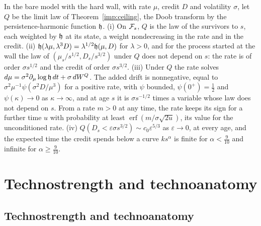 \begin{proposition}\label{imp:limitage}
In the bare model with the hard wall, with rate $\mu$, credit $D$ and
volatility $\sigma$, let $Q$ be the limit law of
Theorem~\ref{imp:ceiling}, the Doob transform by the persistence-harmonic
function $\mathfrak{h}$. (i) On $\mathcal{F}_s$, $Q$ is the law of the survivors to $s$,
each weighted by $\mathfrak{h}$ at its state, a weight nondecreasing in the rate
and in the credit. (ii)
$\mathfrak{h}(\lambda\mu,\lambda^3D)=\lambda^{1/2}\mathfrak{h}(\mu,D)$ for $\lambda>0$, and
for the process started at the wall the law of
$(\mu_s/s^{1/2},D_s/s^{3/2})$ under $Q$ does not depend on $s$: the rate
is of order $\sigma s^{1/2}$ and the credit of order $\sigma s^{3/2}$.
(iii) Under $Q$ the rate solves
$d\mu=\sigma^2\partial_\mu\log\mathfrak{h}\,dt+\sigma\,dW^Q$. The added drift is
nonnegative, equal to $\sigma^2\mu^{-1}\psi(\sigma^2D/\mu^3)$ for a
positive rate, with $\psi$ bounded, $\psi(0^+)=\tfrac12$ and
$\psi(\kappa)\to0$ as $\kappa\to\infty$, and at age $s$ it is
$\sigma s^{-1/2}$ times a variable whose law does not depend on $s$. From
a rate $m>0$ at any time, the rate keeps its sign for a further time $u$
with probability at least $\operatorname{erf}(m/\sigma\sqrt{2u})$, its
value for the unconditioned rate. (iv)
$Q(D_s<\varepsilon\sigma s^{3/2})\sim c_0\varepsilon^{5/3}$ as
$\varepsilon\to0$, at every age, and the expected time the credit spends
below a curve $ks^{\alpha}$ is finite for $\alpha<\tfrac9{10}$ and
infinite for $\alpha\ge\tfrac9{10}$.
\end{proposition}

\section{Technostrength and technoanatomy}\label{sec:coords}

\subsection{Technostrength and technoanatomy}\label{gr:sub:coords}

